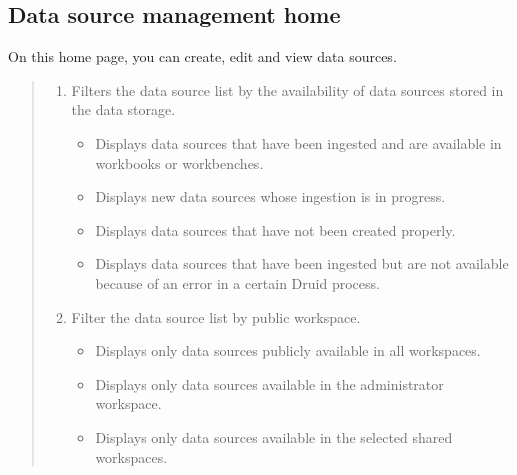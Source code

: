 \documentclass[letterpaper,10pt,english]{sphinxmanual}
\begin{document}
\subsection{Data source management home}
\label{\detokenize{discovery/part02/manage_data_sources:id1}}\label{\detokenize{discovery/part02/manage_data_sources::doc}}
On this home page, you can create, edit and view data sources.
\begin{quote}

\begin{figure}[H]
\centering

\noindent{}
\end{figure}
\begin{enumerate}
\def\theenumi{\arabic{enumi}}
\def\labelenumi{\theenumi .}
\makeatletter\def\p@enumii{\p@enumi \theenumi .}\makeatother
\item {} 
 Filters the data source list by the availability of data sources stored in the data storage.
\begin{itemize}
\item {} 
 Displays data sources that have been ingested and are available in workbooks or workbenches.

\item {} 
 Displays new data sources whose ingestion is in progress.

\item {} 
 Displays data sources that have not been created properly.

\item {} 
 Displays data sources that have been ingested but are not available because of an error in a certain Druid process.

\end{itemize}

\item {} 
 Filter the data source list by public workspace.
\begin{itemize}
\item {} 
 Displays only data sources publicly available in all workspaces.

\item {} 
 Displays only data sources available in the administrator workspace.

\item {} 
 Displays only data sources available in the selected shared workspaces.


\end{itemize}
\end{enumerate}
\end{quote}
\end{document}
